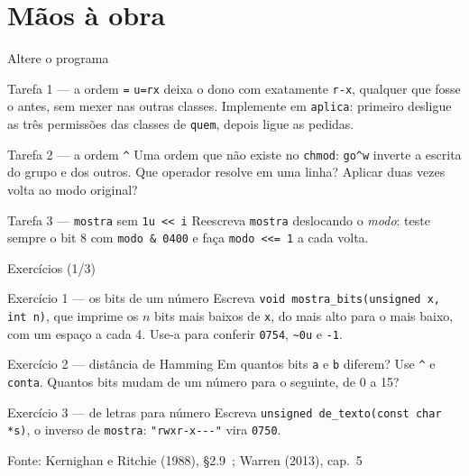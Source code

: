 \documentclass[aspectratio=169]{beamer}
\newcommand{\til}{\textasciitilde}
\newcommand{\cir}{\textasciicircum}
\newcommand{\fonte}[1]{\vfill\hfill{\scriptsize\textcolor{UFSGray}{Fonte: #1}}}
\begin{document}
\section{Mãos à obra}

\begin{frame}{Altere o programa}
  \begin{block}{Tarefa 1 --- a ordem \texttt{=}}
    \small \texttt{u=rx} deixa o dono com exatamente \texttt{r-x}, qualquer
    que fosse o antes, sem mexer nas outras classes. Implemente em
    \texttt{aplica}: primeiro desligue as três permissões das classes de
    \texttt{quem}, depois ligue as pedidas.
  \end{block}
  \begin{block}{Tarefa 2 --- a ordem \texttt{\cir}}
    \small Uma ordem que não existe no \texttt{chmod}: \texttt{go\cir w}
    inverte a escrita do grupo e dos outros. Que operador resolve em uma
    linha? Aplicar duas vezes volta ao modo original?
  \end{block}
  \begin{block}{Tarefa 3 --- \texttt{mostra} sem \texttt{1u <{}< i}}
    \small Reescreva \texttt{mostra} deslocando o \emph{modo}: teste sempre o
    bit 8 com \texttt{modo \& 0400} e faça \texttt{modo <{}<= 1} a cada volta.
  \end{block}
\end{frame}

\begin{frame}{Exercícios (1/3)}
  \footnotesize
  \begin{block}{Exercício 1 --- os bits de um número}
    Escreva \texttt{void mostra\_bits(unsigned x, int n)}, que imprime os $n$
    bits mais baixos de \texttt{x}, do mais alto para o mais baixo, com um
    espaço a cada 4. Use-a para conferir \texttt{0754}, \texttt{\til 0u} e
    \texttt{-1}.
  \end{block}
  \begin{block}{Exercício 2 --- distância de Hamming}
    Em quantos bits \texttt{a} e \texttt{b} diferem? Use \texttt{\cir} e
    \texttt{conta}. Quantos bits mudam de um número para o seguinte, de 0
    a 15?
  \end{block}
  \begin{block}{Exercício 3 --- de letras para número}
    Escreva \texttt{unsigned de\_texto(const char *s)}, o inverso de
    \texttt{mostra}: \texttt{"rwxr-x-{}-{}-"} vira \texttt{0750}.
  \end{block}
  \fonte{Kernighan e Ritchie (1988), §2.9~\cite{kernighan1988c};
    Warren (2013), cap.~5~\cite{warren2013hackers}}
\end{frame}
\end{document}
